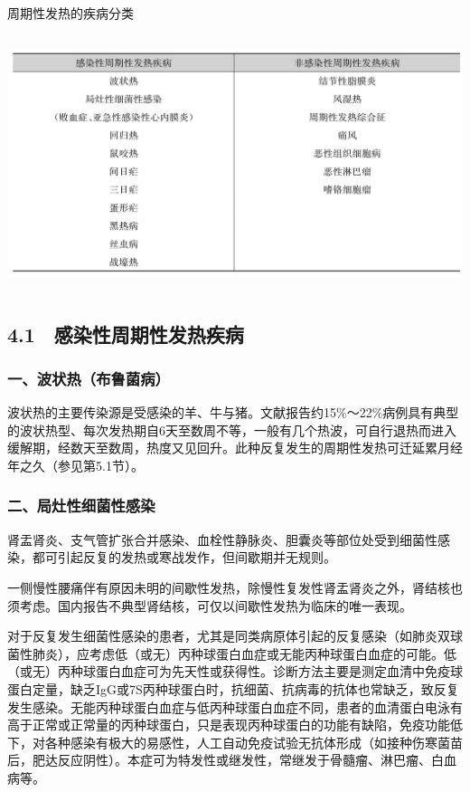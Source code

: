 \begin{table}[htbp]
\centering
\caption{周期性发热的疾病分类}
\label{tab2-13}
\includegraphics[width=5.92708in,height=2.9375in]{./images/Image00018.jpg}
\end{table}

\subsection{4.1　感染性周期性发热疾病}

\subsubsection{一、波状热（布鲁菌病）}

波状热的主要传染源是受感染的羊、牛与猪。文献报告约15\%～22\%病例具有典型的波状热型、每次发热期自6天至数周不等，一般有几个热波，可自行退热而进入缓解期，经数天至数周，热度又见回升。此种反复发生的周期性发热可迁延累月经年之久（参见第5.1节）。

\subsubsection{二、局灶性细菌性感染}

肾盂肾炎、支气管扩张合并感染、血栓性静脉炎、胆囊炎等部位处受到细菌性感染，都可引起反复的发热或寒战发作，但间歇期并无规则。

一侧慢性腰痛伴有原因未明的间歇性发热，除慢性复发性肾盂肾炎之外，肾结核也须考虑。国内报告不典型肾结核，可仅以间歇性发热为临床的唯一表现。

对于反复发生细菌性感染的患者，尤其是同类病原体引起的反复感染（如肺炎双球菌性肺炎），应考虑低（或无）丙种球蛋白血症或无能丙种球蛋白血症的可能。低（或无）丙种球蛋白血症可为先天性或获得性。诊断方法主要是测定血清中免疫球蛋白定量，缺乏IgG或7S丙种球蛋白时，抗细菌、抗病毒的抗体也常缺乏，致反复发生感染。无能丙种球蛋白血症与低丙种球蛋白血症不同，患者的血清蛋白电泳有高于正常或正常量的丙种球蛋白，只是表现丙种球蛋白的功能有缺陷，免疫功能低下，对各种感染有极大的易感性，人工自动免疫试验无抗体形成（如接种伤寒菌苗后，肥达反应阴性）。本症可为特发性或继发性，常继发于骨髓瘤、淋巴瘤、白血病等。

